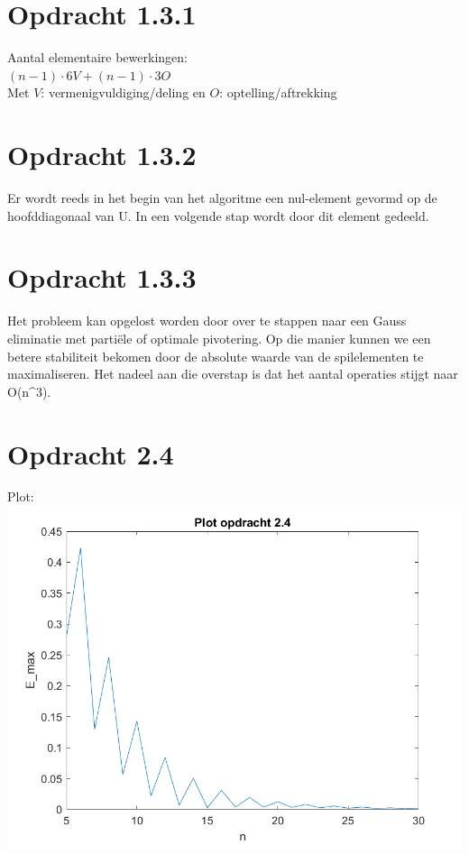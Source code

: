 \documentclass[a4paper]{article}
\begin{document}
\section*{Opdracht 1.3.1}
Aantal elementaire bewerkingen:
\\$(n-1) \cdot 6V + (n-1) \cdot 3O$
\\Met $V$: vermenigvuldiging/deling en $O$: optelling/aftrekking
%
%
%
%
%
%
\section*{Opdracht 1.3.2}
Er wordt reeds in het begin van het algoritme een nul-element gevormd op de hoofddiagonaal van U. In een volgende stap wordt door dit element gedeeld.

%
%
%
%
%
\section*{Opdracht 1.3.3}
Het probleem kan opgelost worden door over te stappen naar een Gauss eliminatie met partiële of optimale pivotering. Op die manier kunnen we een betere stabiliteit bekomen door de absolute waarde van de spilelementen te maximaliseren. Het nadeel aan die overstap is dat het aantal operaties stijgt naar O(n^3). 
%
%
%
%
%
%
\section*{Opdracht 2.4}
Plot:
\\{}
\includegraphics[scale = 0.8]{plot2_4}
%
%
%
%
%
%
\end{document}
